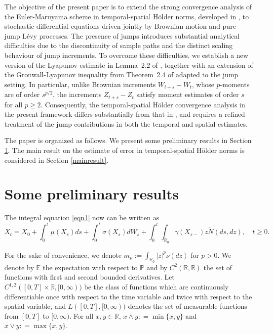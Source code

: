 \documentclass[11pt]{article}
\theoremstyle{theorem}
\theoremstyle{definition}
\newcommand{\bR}{\mathbb{R}}
\newcommand{\pr}{\mathbb{P}}
\newcommand{\1}{{\bf 1}}
\begin{document}
The objective of the present paper is to extend the strong convergence analysis of the Euler-Maruyama scheme in temporal-spatial H\"older norms, developed in \cite{HN22}, to stochastic differential equations driven jointly by Brownian motion and pure-jump L\'evy processes. The presence of jumps introduces substantial analytical difficulties due to the discontinuity of sample paths and the distinct scaling behaviour of jump increments. To overcome these difficulties, we establish a new version of the Lyapunov estimate in Lemma~2.2 of \cite{CHJ22}, together with an extension of the Gronwall-Lyapunov inequality from Theorem~2.4 of \cite{HHM21} adapted to the jump setting. In particular, unlike Brownian increments $W_{t+s}-W_{t}$, whose \(p\)-moments are of order \(s^{p/2}\), the increments $Z_{t+s}-Z_{t}$ satisfy moment estimates of order \(s\) for all \(p\geq2\). Consequently, the temporal-spatial H\"older convergence analysis in the present framework differs substantially from that in \cite{HN22}, and requires a refined treatment of the jump contributions in both the temporal and spatial estimates.

The paper is organized as follows. We present some preliminary results in Section \ref{Preli}. The main result on the estimate of error in temporal-spatial H\"older norms is considered in Section \ref{mainresult}. 


\section{Some preliminary results} \label{Preli}



The integral equation \eqref{eqn1} now can be written as 
\begin{equation*} 
X_t=X_0+\int_0^t \mu(X_s)ds+\int_0^t \sigma(X_s)dW_s + \int_0^t\int_{\mathbb{R}_0} \gamma \left(X_{s-}\right)z\widetilde{N}(d s, d z), \quad t \geq 0.
\end{equation*}	


For the sake of convenience, we denote $ m_p:= \int_{\bR_0}\vert z\vert^p\nu(d z)$ for $p>0$. We denote by $\mathbb{E}$ the expectation with respect to $\pr$ and by $C^2(\mathbb{R}, \mathbb{R})$ the set of functions with first and second bounded derivatives. Let $C^{1,2}([0, T]\times \mathbb{R}, [0, \infty))$ be the class of functions which are continuously differentiable once with respect to the time variable and twice with respect to the spatial variable, and $L([0, T], [0, \infty))$  denotes the set of measurable functions from $[0, T]$ to $[0, \infty)$. For all $x, y \in \mathbb{R}$, $x \land y: =\min \{x, y\}$ and $x \vee y: =\max \{x, y\}$.
\end{document}
